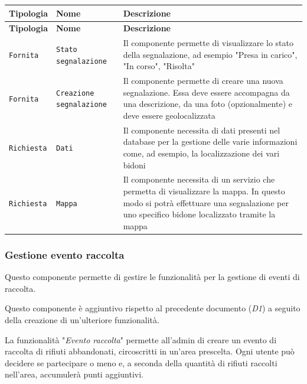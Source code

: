 \documentclass[12pt,a4paper]{article}
\begin{document}
\begin{tabularx}{\textwidth}{@{}llX@{}}
\caption{Tabelle descrizione componente per gestione delle segnalazioni}
\label{tab:placeholder} \\

\toprule
\textbf{Tipologia} & \textbf{Nome} & \textbf{Descrizione} \\
\midrule
\endfirsthead

\toprule
\textbf{Tipologia} & \textbf{Nome} & \textbf{Descrizione} \\
\midrule
\endhead

\bottomrule
\endfoot

\texttt{Fornita} & \texttt{Stato segnalazione} & Il componente permette di visualizzare lo stato della segnalazione, ad esempio "Presa in carico", "In corso", "Risolta"\\ \hline
\texttt{Fornita} & \texttt{Creazione segnalazione} & Il componente permette di creare una nuova segnalazione. Essa deve essere accompagna da una descrizione, da una foto (opzionalmente) e deve essere geolocalizzata\\ \hline
\texttt{Richiesta} & \texttt{Dati} & Il componente necessita di dati presenti nel database per la gestione delle varie informazioni come, ad esempio, la localizzazione dei vari bidoni\\ \hline 
\texttt{Richiesta} & \texttt{Mappa} & Il componente necessita di un servizio che permetta di visualizzare la mappa. In questo modo si potrà effettuare una segnalazione per uno specifico bidone localizzato tramite la mappa\\ 

\end{tabularx}

\subsubsection{Gestione evento raccolta}
Questo componente permette di gestire le funzionalità per la gestione di eventi di raccolta.

Questo componente è aggiuntivo rispetto al precedente documento (\textit{D1}) a seguito della creazione di un'ulteriore funzionalità.

La funzionalità "\textit{Evento raccolta}" permette all'admin di creare un evento di raccolta di rifiuti abbandonati, circoscritti in un'area prescelta. Ogni utente può decidere se partecipare o meno e, a seconda della quantità di rifiuti raccolti nell'area, accumulerà punti aggiuntivi.
\end{document}
